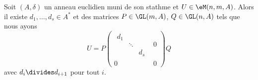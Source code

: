 \begin{proposition}   \label{PropPDfCqee}
    Soit \( (A,\delta)\) un anneau euclidien muni de son stathme  et \( U\in \eM(n,m,A)\). Alors il existe \( d_1,\ldots, d_s\in A^*\) et des matrices \( P\in\GL(m,A)\), \( Q\in \GL(n,A)\) tels que nous ayons
    \begin{equation}
        U=P \begin{pmatrix}
            \begin{matrix}
                d_1    &       &       \\
                    &   \ddots    &       \\
                    &       &   d_s
            \end{matrix}&   0    \\ 
            0    &   0    
        \end{pmatrix}Q
    \end{equation}
    avec \( d_i\divides d_{i+1}\) pour tout \( i\).
\end{proposition}

